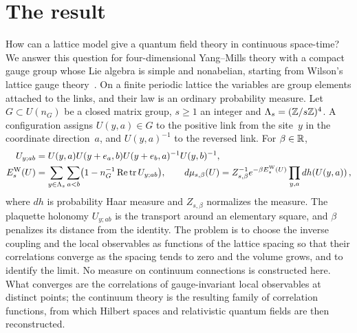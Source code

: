 \makeatletter
\providecommand{\equationalias}[1]{\protected@write\@auxout{}{\string\newlabel{#1}{{\theequation}{\thepage}{}{equation.\theHequation}{}}}}
\makeatother

\section{The result}\label{sec:introduction}\label{sec:result}

How can a lattice model give a quantum field theory in continuous space-time? We answer this question for four-dimensional Yang--Mills theory with a compact gauge group whose Lie algebra is simple and nonabelian, starting from Wilson's lattice gauge theory~\cite{Wilson1974}. On a finite periodic lattice the variables are group elements attached to the links, and their law is an ordinary probability measure. Let $G\subset U(n_G)$ be a closed matrix group, $s\ge1$ an integer and $\Lambda_s=(\mathbb{Z}/s\mathbb{Z})^4$. A configuration assigns $U(y,a)\in G$ to the positive link from the site~$y$ in the coordinate direction~$a$, and $U(y,a)^{-1}$ to the reversed link. For $\beta\in\mathbb{R}$,
\begin{equation}\label{eq:intro-wilson}
\begin{aligned}
U_{y;ab}&=U(y,a)U(y+e_a,b)U(y+e_b,a)^{-1}U(y,b)^{-1},\\
E_s^{\rm W}(U)&=\sum_{y\in\Lambda_s}\sum_{a<b}\bigl(1-n_G^{-1}\operatorname{Re}\operatorname{tr} U_{y;ab}\bigr),\qquad
d\mu_{s,\beta}(U)=Z_{s,\beta}^{-1}e^{-\beta E_s^{\rm W}(U)}\prod_{y,a}dh(U(y,a))\,,
\end{aligned}
\end{equation}
where $dh$ is probability Haar measure and $Z_{s,\beta}$ normalizes the measure. The plaquette holonomy $U_{y;ab}$ is the transport around an elementary square, and $\beta$ penalizes its distance from the identity. The problem is to choose the inverse coupling and the local observables as functions of the lattice spacing so that their correlations converge as the spacing tends to zero and the volume grows, and to identify the limit. No measure on continuum connections is constructed here. What converges are the correlations of gauge-invariant local observables at distinct points; the continuum theory is the resulting family of correlation functions, from which Hilbert spaces and relativistic quantum fields are then reconstructed.

